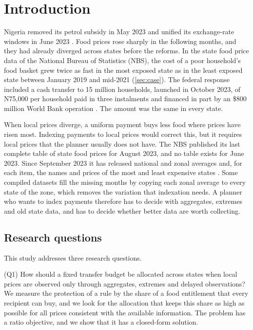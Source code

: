 \documentclass[preprint,12pt,number]{elsarticle}%
\theoremstyle{definition}
\theoremstyle{remark}
\begin{document}
\section{Introduction}\label{sec:intro}

Nigeria removed its petrol subsidy in May 2023 and unified its exchange-rate windows in June 2023 \citep{tinubu2023inaugural,cbn2023fx}. Food prices rose sharply in the following months, and they had already diverged across states before the reforms. In the state food price data of the National Bureau of Statistics (NBS), the cost of a poor household's food basket grew twice as fast in the most exposed state as in the least exposed state between January 2019 and mid-2021 (\cref{sec:case}). The federal response included a cash transfer to 15 million households, launched in October 2023, of N75,000 per household paid in three instalments and financed in part by an \$800 million World Bank operation \citep{nairametrics2023nassp}. The amount was the same in every state.

When local prices diverge, a uniform payment buys less food where prices have risen most. Indexing payments to local prices would correct this, but it requires local prices that the planner usually does not have. The NBS published its last complete table of state food prices for August 2023, and no table exists for June 2023. Since September 2023 it has released national and zonal averages and, for each item, the names and prices of the most and least expensive states \citep{nbs2026econs}. Some compiled datasets fill the missing months by copying each zonal average to every state of the zone, which removes the variation that indexation needs. A planner who wants to index payments therefore has to decide with aggregates, extremes and old state data, and has to decide whether better data are worth collecting.

\subsection{Research questions}\label{sec:rq}

This study addresses three research questions.

(Q1) How should a fixed transfer budget be allocated across states when local prices are observed only through aggregates, extremes and delayed observations? We measure the protection of a rule by the share of a food entitlement that every recipient can buy, and we look for the allocation that keeps this share as high as possible for all prices consistent with the available information. The problem has a ratio objective, and we show that it has a closed-form solution.
\end{document}
